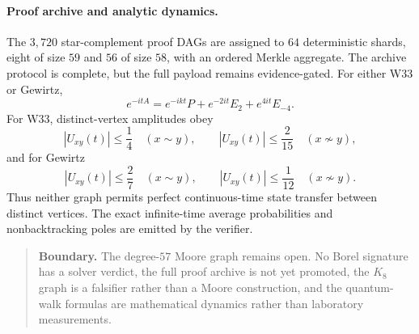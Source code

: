 \paragraph{Proof archive and analytic dynamics.}
The \(3{,}720\) star-complement proof DAGs are assigned to \(64\) deterministic shards, eight of size \(59\) and \(56\) of size \(58\), with an ordered Merkle aggregate. The archive protocol is complete, but the full payload remains evidence-gated.
For either W33 or Gewirtz,
\[
e^{-itA}=e^{-ikt}P+e^{-2it}E_2+e^{4it}E_{-4}.
\]
For W33, distinct-vertex amplitudes obey
\[
|U_{xy}(t)|\le \frac14\quad(x\sim y),
\qquad
|U_{xy}(t)|\le \frac{2}{15}\quad(x\nsim y),
\]
and for Gewirtz
\[
|U_{xy}(t)|\le \frac27\quad(x\sim y),
\qquad
|U_{xy}(t)|\le \frac1{12}\quad(x\nsim y).
\]
Thus neither graph permits perfect continuous-time state transfer between distinct vertices. The exact infinite-time average probabilities and nonbacktracking poles are emitted by the verifier.

\begin{quote}
\textbf{Boundary.}
The degree-\(57\) Moore graph remains open. No Borel signature has a solver verdict, the full proof archive is not yet promoted, the \(K_8\) graph is a falsifier rather than a Moore construction, and the quantum-walk formulas are mathematical dynamics rather than laboratory measurements.
\end{quote}
